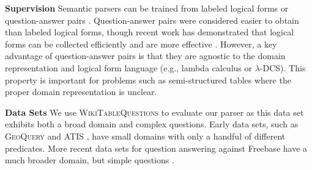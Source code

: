 \textbf{Supervision} Semantic parsers can be trained from labeled logical forms \cite{zelle1996,zettlemoyer05} or question-answer pairs \cite{liang2011learning,berant2013}. Question-answer pairs were considered easier to obtain than labeled logical forms, though recent work has demonstrated that logical forms can be collected efficiently and are more effective \cite{yih2016value}. However, a key advantage of question-answer pairs is that they are agnostic to the domain representation and logical form language (e.g., lambda calculus or $\lambda$-DCS). This property is important for problems such as semi-structured tables where the proper domain representation is unclear.


\textbf{Data Sets} We use \textsc{WikiTableQuestions} to evaluate our parser as this data set exhibits both a broad domain and complex questions.
Early data sets, such as \textsc{GeoQuery} \cite{zelle1996} and \textsc{ATIS} \cite{dahl1994}, have small domains with only a handful of different predicates. More recent data sets for question answering against Freebase have a much broader domain, but simple questions \cite{berant2013,cai2013}.

